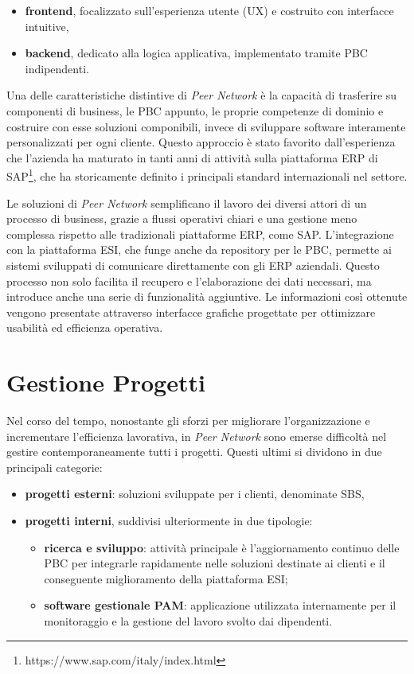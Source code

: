\begin{itemize}
    \item \textbf{frontend}, focalizzato sull’esperienza utente (UX) e costruito con interfacce intuitive,
    \item \textbf{backend}, dedicato alla logica applicativa, implementato tramite \ac{PBC} indipendenti.
\end{itemize}

Una delle caratteristiche distintive di \textit{Peer Network} è la capacità di trasferire su componenti di business, le \ac{PBC} appunto, le proprie
competenze di dominio e costruire con esse soluzioni componibili, invece di sviluppare software interamente personalizzati per ogni cliente.
Questo approccio è stato favorito dall’esperienza che l’azienda ha maturato in tanti anni di attività sulla piattaforma \ac{ERP} di
SAP\footnote{https://www.sap.com/italy/index.html}, che ha storicamente definito i principali standard internazionali nel settore.

Le soluzioni di \textit{Peer Network} semplificano il lavoro dei diversi attori di un processo di business, grazie a flussi operativi chiari e una
gestione meno complessa rispetto alle tradizionali piattaforme \ac{ERP}, come SAP. L'integrazione con la piattaforma \ac{ESI}, che funge anche da
repository per le \ac{PBC}, permette ai sistemi sviluppati di comunicare direttamente con gli \ac{ERP} aziendali. Questo processo non solo facilita
il recupero e l'elaborazione dei dati necessari, ma introduce anche una serie di funzionalità aggiuntive. Le informazioni così ottenute vengono
presentate attraverso interfacce grafiche progettate per ottimizzare usabilità ed efficienza operativa.

\section{Gestione Progetti}
Nel corso del tempo, nonostante gli sforzi per migliorare l’organizzazione e incrementare l’efficienza lavorativa, in \textit{Peer Network} sono
emerse difficoltà nel gestire contemporaneamente tutti i progetti. Questi ultimi si dividono in due principali categorie:

\begin{itemize}
    \item \textbf{progetti esterni}: soluzioni sviluppate per i clienti, denominate \ac{SBS},
    \item \textbf{progetti interni}, suddivisi ulteriormente in due tipologie:
        \begin{itemize}
            \item \textbf{ricerca e sviluppo}: attività principale è l'aggiornamento continuo delle \ac{PBC} per integrarle
            rapidamente nelle soluzioni destinate ai clienti e il conseguente miglioramento della piattaforma \ac{ESI};
            \item \textbf{software gestionale \ac{PAM}}: applicazione utilizzata internamente per il monitoraggio e la gestione del lavoro svolto dai dipendenti.
        \end{itemize}
\end{itemize}

